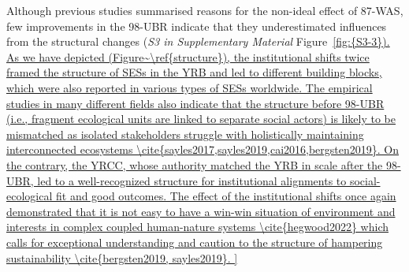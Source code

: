 Although previous studies summarised reasons for the non-ideal effect of 87-WAS, few improvements in the 98-UBR indicate that they underestimated influences from the structural changes (\textit{S3 in Supplementary Material} Figure~\ref{fig:{S3-3}).
As we have depicted (Figure~\ref{structure}), the institutional shifts twice framed the structure of SESs in the YRB and led to different building blocks, which were also reported in various types of SESs worldwide.
The empirical studies in many different fields also indicate that the structure before 98-UBR (i.e., fragment ecological units are linked to separate social actors) is likely to be mismatched as isolated stakeholders struggle with holistically maintaining interconnected ecosystems
\cite{sayles2017,sayles2019,cai2016,bergsten2019}.
On the contrary, the YRCC, whose authority matched the YRB in scale after the 98-UBR, led to a well-recognized structure for institutional alignments to social-ecological fit and good outcomes.
The effect of the institutional shifts once again demonstrated that it is not easy to have a win-win situation of environment and interests in complex coupled human-nature systems \cite{hegwood2022} which calls for exceptional understanding and caution to the structure of hampering sustainability \cite{bergsten2019, sayles2019}.

}
